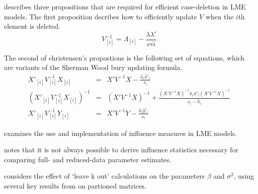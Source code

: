 \documentclass[12pt, a4paper]{report}
\theoremstyle{plain}
\theoremstyle{definition}
\theoremstyle{remark}
\begin{document}
	
	\citet{Christensen} describes three propositions that are required
	for efficient case-deletion in LME models. The first proposition
	decribes how to efficiently update $V$ when the $i$th element is
	deleted.
	\begin{equation}
	V_{[i]}^{-1} = \Lambda_{[i]} - \frac{\lambda
		\lambda\prime}{\nu^{}ii}
	\end{equation}
	
	The second of christensen's propostions is the following set of
	equations, which are variants of the Sherman Wood bury updating
	formula.
	\begin{eqnarray}
	X'_{[i]}V_{[i]}^{-1}X_{[i]} &=& X' V^{-1}X -
	\frac{\hat{x}_{i}\hat{x}'_{i}}{s_{i}}\\
	(X'_{[i]}V_{[i]}^{-1}X_{[i]})^{-1} &=& (X' V^{-1}X)^{-1} +
	\frac{(X' V^{-1}X)^{-1}\hat{x}_{i}\hat{x}' _{i}
		(X' V^{-1}X)^{-1}}{s_{i}- \bar{h}_{i}}\\
	X'_{[i]}V_{[i]}^{-1}Y_{[i]} &=& X\prime V^{-1}Y -
	\frac{\hat{x}_{i}\hat{y}' _{i}}{s_{i}}
	\end{eqnarray}
	
	
	\citet{schabenberger} examines the use and implementation of
	influence measures in LME models.
	
	
	
	
	
	
	
	
	
	
	
	
	
	
	
	
	
	
	
	\citet{schabenberger} notes that it is not always possible to
	derive influence statistics necessary for comparing full- and
	reduced-data parameter estimates. 
	
	

	
	
	
	\citet{Haslett99} considers the effect of `leave k out'
	calculations on the parameters $\beta$ and $\sigma^{2}$, using
	several key results from \citet{HaslettHayes} on partioned
	matrices.
	
	
	
	
	
	
	
\end{document}
